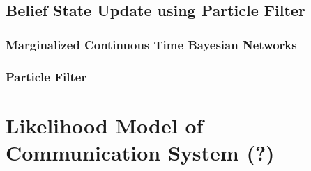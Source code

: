 %

\subsection{Belief State Update using Particle Filter}

\subsubsection{Marginalized Continuous Time Bayesian Networks}

\subsubsection{Particle Filter}

\section{Likelihood Model of Communication System (?)}